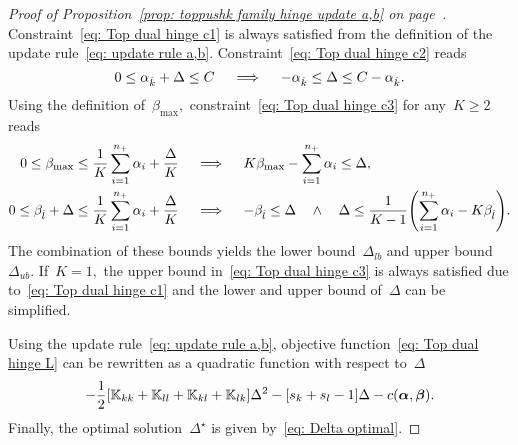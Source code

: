 \topruleab*
\begin{proof}[Proof of Proposition~\ref{prop: toppushk family hinge update a,b} on page~\pageref{prop: toppushk family hinge update a,b}]
  Constraint~\eqref{eq: Top dual hinge c1} is always satisfied from the definition of the update rule~\eqref{eq: update rule a,b}. Constraint~\eqref{eq: Top dual hinge c2} reads
  \begin{equation*}
    0 \leq \alpha_{\hat{k}} + \Delta \leq C
    \quad \implies \quad
    - \alpha_{\hat{k}} \leq \Delta \leq C - \alpha_{\hat{k}}.
  \end{equation*}
  Using the definition of~$\beta_{\max},$ constraint~\eqref{eq: Top dual hinge c3} for any~$K \geq 2$ reads
  \begin{align*}
    0 \leq \beta_{\max} \leq \frac{1}{K} \sum_{i = 1}^{\npos} \alpha_i + \frac{\Delta}{K} 
    & \quad \implies \quad
    K\beta_{\max} - \sum_{i = 1}^{\npos} \alpha_i \leq \Delta, \\
    0 \leq \betal + \Delta \leq \frac{1}{K} \sum_{i = 1}^{\npos} \alpha_i + \frac{\Delta}{K}
    & \quad \implies \quad
    -\betal \leq \Delta \quad \land \quad \Delta \leq \frac{1}{K-1}\Brac{\sum_{i = 1}^{\npos} \alpha_i - K \betal}.
  \end{align*}
  The combination of these bounds yields the lower bound~$\Delta_{lb}$ and upper bound~$\Delta_{ub}.$ If~$K = 1,$ the upper bound in~\eqref{eq: Top dual hinge c3} is always satisfied due to~\eqref{eq: Top dual hinge c1} and the lower and upper bound of~$\Delta$ can be simplified.
  
  Using the update rule~\eqref{eq: update rule a,b}, objective function~\eqref{eq: Top dual hinge L} can be rewritten as a quadratic function with respect to~$\Delta$
  \begin{equation*}
    - \frac{1}{2} \Brac[s]{\K_{kk} + \K_{ll} + \K_{kl} + \K_{lk}} \Delta^2
    - \Brac[s]{s_k + s_l - 1} \Delta
    - c(\bm{\alpha}, \bm{\beta}).
  \end{equation*}
  Finally, the optimal solution~$\Delta^{\star}$ is given by~\eqref{eq: Delta optimal}.
\end{proof}

